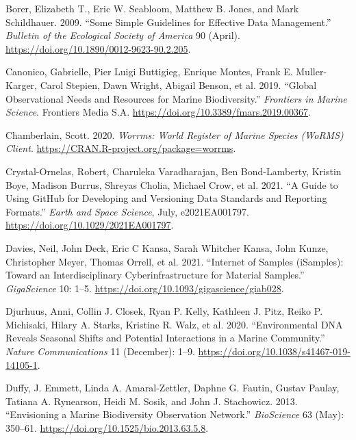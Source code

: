 \documentclass[
]{book}
\newlength{\cslhangindent}
\newlength{\cslentryspacingunit} %
\newenvironment{CSLReferences}[2] %
 {%
  \setlength{\parindent}{0pt}
  \ifodd #1
  \let\oldpar\par
  \def\par{\hangindent=\cslhangindent\oldpar}
  \fi
  \setlength{\parskip}{#2\cslentryspacingunit}
 }%
 {}
\begin{document}
\begin{CSLReferences}{1}{0}
\leavevmode{}%
Borer, Elizabeth T., Eric W. Seabloom, Matthew B. Jones, and Mark Schildhauer. 2009. {``Some Simple Guidelines for Effective Data Management.''} \emph{Bulletin of the Ecological Society of America} 90 (April). \url{https://doi.org/10.1890/0012-9623-90.2.205}.

\leavevmode{}%
Canonico, Gabrielle, Pier Luigi Buttigieg, Enrique Montes, Frank E. Muller-Karger, Carol Stepien, Dawn Wright, Abigail Benson, et al. 2019. {``Global Observational Needs and Resources for Marine Biodiversity.''} \emph{Frontiers in Marine Science}. Frontiers Media S.A. \url{https://doi.org/10.3389/fmars.2019.00367}.

\leavevmode{}%
Chamberlain, Scott. 2020. \emph{Worrms: World Register of Marine Species (WoRMS) Client}. \url{https://CRAN.R-project.org/package=worrms}.

\leavevmode{}%
Crystal-Ornelas, Robert, Charuleka Varadharajan, Ben Bond-Lamberty, Kristin Boye, Madison Burrus, Shreyas Cholia, Michael Crow, et al. 2021. {``A Guide to Using GitHub for Developing and Versioning Data Standards and Reporting Formats.''} \emph{Earth and Space Science}, July, e2021EA001797. \url{https://doi.org/10.1029/2021EA001797}.

\leavevmode{}%
Davies, Neil, John Deck, Eric C Kansa, Sarah Whitcher Kansa, John Kunze, Christopher Meyer, Thomas Orrell, et al. 2021. {``Internet of Samples (iSamples): Toward an Interdisciplinary Cyberinfrastructure for Material Samples.''} \emph{GigaScience} 10: 1--5. \url{https://doi.org/10.1093/gigascience/giab028}.

\leavevmode{}%
Djurhuus, Anni, Collin J. Closek, Ryan P. Kelly, Kathleen J. Pitz, Reiko P. Michisaki, Hilary A. Starks, Kristine R. Walz, et al. 2020. {``Environmental DNA Reveals Seasonal Shifts and Potential Interactions in a Marine Community.''} \emph{Nature Communications} 11 (December): 1--9. \url{https://doi.org/10.1038/s41467-019-14105-1}.

\leavevmode{}%
Duffy, J. Emmett, Linda A. Amaral-Zettler, Daphne G. Fautin, Gustav Paulay, Tatiana A. Rynearson, Heidi M. Sosik, and John J. Stachowicz. 2013. {``Envisioning a Marine Biodiversity Observation Network.''} \emph{BioScience} 63 (May): 350--61. \url{https://doi.org/10.1525/bio.2013.63.5.8}.


\end{CSLReferences}
\end{document}
